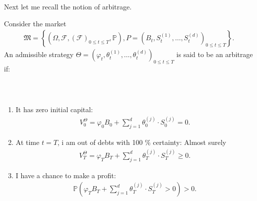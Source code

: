 \documentclass{beamer}
\numberwithin{equation}{section}
\begin{document}
\begin{frame}\frametitle{{\normalsize \secname} \\ {\large \subsecname}}
    Next let me recall the notion of arbitrage.
    \begin{definition}[Arbitrage]
        Consider the market
        \begingroup
        \footnotesize
        \begin{align}
            \mathfrak{M} =
            \left\{
                \left(
                    \Omega,
                    \mathscr{F},
                    \left(
                        \mathscr{F}
                    \right)_{0 \leq t \leq T},
                    \mathbb{P}
                \right),
                P =
                \left(
                    B_t,
                    S_t^{(1)},
                    \ldots,
                    S_t^{(d)}
                \right)_{0 \leq t \leq T}
            \right\}.
        \end{align}
        \endgroup
        An admissible strategy $\Theta = \left(\varphi_t, \theta_t^{(1)}, \ldots, \theta_t^{(d)}\right)_{0 \leq t \leq T}$ is said to be an arbitrage if:
    \end{definition}
\end{frame}

\begin{frame}\frametitle{{\normalsize \secname} \\ {\large \subsecname}}
    \begin{enumerate}
        \item It has zero initial capital:
        \begin{align}
            V_0^\Theta = \varphi_0B_0 + \sum_{j = 1}^d\theta_0^{(j)} \cdot S_0^{(j)} = 0.
        \end{align}
        \item At time $t = T$, i am out of debts with 100 \% certainty: Almost surely
        \begin{align}
            V_T^\Theta = \varphi_T B_T + \sum_{j = 1}^d\theta_T^{(j)} \cdot S_T^{(j)} \geq 0.
        \end{align}
        \item I have a chance to make a profit:
        \begin{align}
            \mathbb{P}
            \left(
                \varphi_TB_T + \sum_{j = 1}^d \theta_T^{(j)} \cdot S_T^{(j)} > 0
            \right) > 0.
        \end{align}
    \end{enumerate}
\end{frame}
\end{document}
